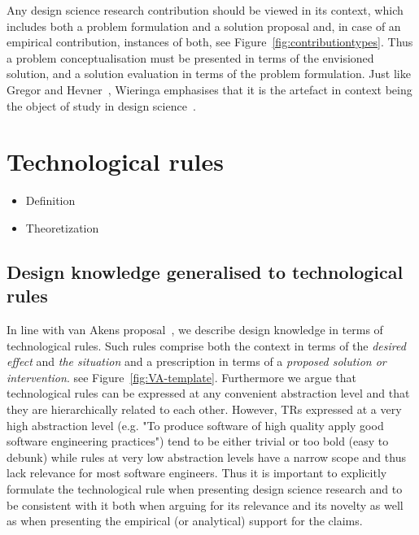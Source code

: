 \documentclass[graybox]{svmult}
\begin{document}
Any design science research contribution should be viewed in its context, which includes both a problem formulation and a solution proposal and, in case of an empirical contribution, instances of both, see Figure~\ref{fig:contributiontypes}. Thus a problem conceptualisation must be presented in terms of the envisioned solution, and a solution evaluation in terms of the problem formulation. 
Just like Gregor and Hevner~\cite{gregor_positioning_2013}, Wieringa emphasises that it is the artefact in context being the object of study in design science~\cite{wieringa_design_2009}.

\section{Technological rules}
\begin{itemize}
\item Definition
\item Theoretization
\end{itemize}

\subsection{Design knowledge generalised to technological rules}
In line with van Akens proposal~\cite{van_aken_management_2004}, we describe design knowledge in terms of technological rules. Such rules comprise both the context in terms of the \emph{desired effect} and \emph{the situation} and a prescription in terms of a \emph{proposed solution or intervention}. see Figure~\ref{fig:VA-template}. Furthermore we argue that technological rules can be expressed at any convenient abstraction level and that they are hierarchically related to each other. However, TRs expressed at a very high abstraction level (e.g. "To produce software of high quality apply good software engineering practices") tend to be either trivial or too bold (easy to debunk) while rules at very low abstraction levels have a narrow scope and thus lack relevance for most software engineers. Thus it is important to explicitly formulate the technological rule when presenting design science research and to be consistent with it both when arguing for its relevance and its novelty as well as when presenting the empirical (or analytical) support for the claims. 
\end{document}
